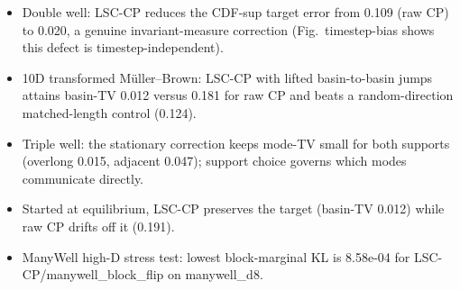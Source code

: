 \begin{itemize}
\item Double well: LSC-CP reduces the CDF-sup target error from 0.109 (raw CP) to 0.020, a genuine invariant-measure correction (Fig.~timestep-bias shows this defect is timestep-independent).
\item 10D transformed M\"uller--Brown: LSC-CP with lifted basin-to-basin jumps attains basin-TV 0.012 versus 0.181 for raw CP and beats a random-direction matched-length control (0.124).
\item Triple well: the stationary correction keeps mode-TV small for both supports (overlong 0.015, adjacent 0.047); support choice governs which modes communicate directly.
\item Started at equilibrium, LSC-CP preserves the target (basin-TV 0.012) while raw CP drifts off it (0.191).
\item ManyWell high-D stress test: lowest block-marginal KL is 8.58e-04 for LSC-CP/manywell\_block\_flip on manywell\_d8.
\end{itemize}
